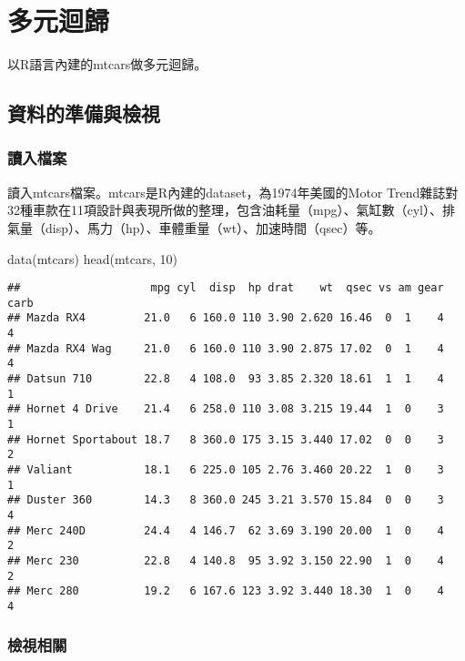 \documentclass[
]{book}
\newenvironment{Shaded}{\begin{snugshade}}{\end{snugshade}}
\newcommand{\DecValTok}[1]{\textcolor[rgb]{0.00,0.00,0.81}{#1}}
\newcommand{\FunctionTok}[1]{\textcolor[rgb]{0.00,0.00,0.00}{#1}}
\newcommand{\NormalTok}[1]{#1}
\begin{document}
\hypertarget{multireg}{%
\chapter{多元迴歸}\label{multireg}}

以R語言內建的mtcars做多元迴歸。

\hypertarget{ux8cc7ux6599ux7684ux6e96ux5099ux8207ux6aa2ux8996}{%
\section{資料的準備與檢視}\label{ux8cc7ux6599ux7684ux6e96ux5099ux8207ux6aa2ux8996}}

\hypertarget{ux8b80ux5165ux6a94ux6848-6}{%
\subsection{讀入檔案}\label{ux8b80ux5165ux6a94ux6848-6}}

讀入mtcars檔案。mtcars是R內建的dataset，為1974年美國的Motor Trend雜誌對32種車款在11項設計與表現所做的整理，包含油耗量（mpg）、氣缸數（cyl）、排氣量（disp）、馬力（hp）、車體重量（wt）、加速時間（qsec）等。

\begin{Shaded}
\begin{Highlighting}[]
\FunctionTok{data}\NormalTok{(mtcars)}
\FunctionTok{head}\NormalTok{(mtcars, }\DecValTok{10}\NormalTok{)}
\end{Highlighting}
\end{Shaded}

\begin{verbatim}
##                    mpg cyl  disp  hp drat    wt  qsec vs am gear carb
## Mazda RX4         21.0   6 160.0 110 3.90 2.620 16.46  0  1    4    4
## Mazda RX4 Wag     21.0   6 160.0 110 3.90 2.875 17.02  0  1    4    4
## Datsun 710        22.8   4 108.0  93 3.85 2.320 18.61  1  1    4    1
## Hornet 4 Drive    21.4   6 258.0 110 3.08 3.215 19.44  1  0    3    1
## Hornet Sportabout 18.7   8 360.0 175 3.15 3.440 17.02  0  0    3    2
## Valiant           18.1   6 225.0 105 2.76 3.460 20.22  1  0    3    1
## Duster 360        14.3   8 360.0 245 3.21 3.570 15.84  0  0    3    4
## Merc 240D         24.4   4 146.7  62 3.69 3.190 20.00  1  0    4    2
## Merc 230          22.8   4 140.8  95 3.92 3.150 22.90  1  0    4    2
## Merc 280          19.2   6 167.6 123 3.92 3.440 18.30  1  0    4    4
\end{verbatim}

\hypertarget{ux6aa2ux8996ux76f8ux95dc}{%
\subsection{檢視相關}\label{ux6aa2ux8996ux76f8ux95dc}}
\end{document}
